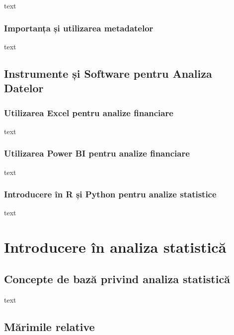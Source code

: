 \documentclass[
  11pt,
  b5paper,
  nottoc]{book}
\begin{document}
text

\subsection{Importanța și utilizarea
metadatelor}\label{importanux21ba-ux219i-utilizarea-metadatelor}

text

\section{Instrumente și Software pentru Analiza
Datelor}\label{instrumente-ux219i-software-pentru-analiza-datelor}

\subsection{Utilizarea Excel pentru analize
financiare}\label{utilizarea-excel-pentru-analize-financiare}

text

\subsection{Utilizarea Power BI pentru analize
financiare}\label{utilizarea-power-bi-pentru-analize-financiare}

text

\subsection{Introducere în R și Python pentru analize
statistice}\label{introducere-uxeen-r-ux219i-python-pentru-analize-statistice}

text


\chapter{Introducere în analiza statistică}\label{cap2}

\section{Concepte de bază privind analiza
statistică}\label{concepte-de-bazux103-privind-analiza-statisticux103}

text

\section{Mărimile relative}\label{mux103rimile-relative}
\end{document}
